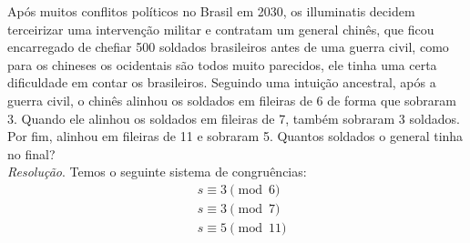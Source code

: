 Após muitos conflitos políticos no Brasil em 2030, os illuminatis decidem terceirizar uma intervenção militar e contratam um general chinês, que ficou encarregado de chefiar 500 soldados brasileiros antes de uma guerra civil, como para os chineses os ocidentais são todos muito parecidos, ele tinha uma certa dificuldade em contar os brasileiros. Seguindo uma intuição ancestral, após a guerra civil, o chinês alinhou os soldados em fileiras de 6 de forma que sobraram 3. Quando ele alinhou os soldados em fileiras de 7, também sobraram 3 soldados. Por fim, alinhou em fileiras de 11 e sobraram 5. Quantos soldados o general tinha no final? \\
\emph{Resolução}.
Temos o seguinte sistema de congruências:
\begin{align*}
	&s \equiv 3 \pmod{6} \\
	&s \equiv 3 \pmod{7} \\
	&s \equiv 5 \pmod{11} \\
\end{align*}

